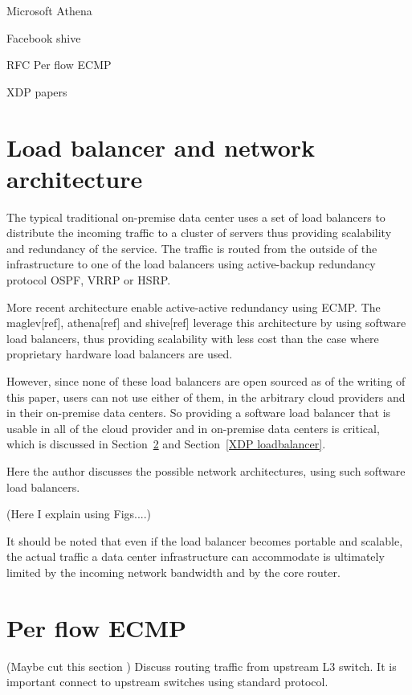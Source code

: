 Microsoft Athena

Facebook shive

RFC Per flow ECMP  

XDP papers

\section{Load balancer and network architecture}\label{Architecture}
The typical traditional on-premise data center uses a set of load balancers to distribute the incoming traffic to a cluster of servers thus providing scalability and redundancy of the service.
The traffic is routed from the outside of the infrastructure to one of the load balancers using active-backup redundancy protocol OSPF, VRRP or HSRP.

More recent architecture enable active-active redundancy using ECMP. The maglev[ref], athena[ref] and shive[ref] leverage this architecture by using software load balancers, thus providing scalability with less cost than the case where proprietary hardware load balancers are used.

However, since none of these load balancers are open sourced as of the writing of this paper, users can not use either of them, in the arbitrary cloud providers and in their on-premise data centers.
So providing a software load balancer that is usable in all of the cloud provider and in on-premise data centers is critical, which is discussed in Section~\ref{IPVS} and Section~\ref{XDP loadbalancer}.

Here the author discusses the possible network architectures, using such software load balancers.

(Here I explain using Figs....)

It should be noted that even if the load balancer becomes portable and scalable, the actual traffic a data center infrastructure can accommodate is ultimately limited by the incoming network bandwidth and by the core router.

\section{Per flow ECMP}\label{IPVS}
(Maybe cut this section )
Discuss routing traffic from upstream L3 switch. 
It is important connect to upstream switches using standard protocol.

